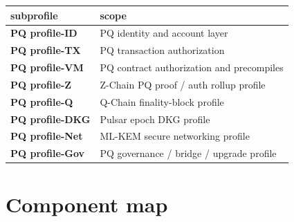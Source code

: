 \documentclass[11pt,a4paper]{article}
\newcommand{\PQ}{\textsf{PQ}}
\begin{document}
\begin{center}\small
\begin{tabular}{l l}
\toprule
subprofile & scope \\
\midrule
\textbf{PQ profile-ID}  & \PQ{} identity and account layer \\
\textbf{PQ profile-TX}  & \PQ{} transaction authorization \\
\textbf{PQ profile-VM}  & \PQ{} contract authorization and precompiles \\
\textbf{PQ profile-Z}   & Z-Chain \PQ{} proof / auth rollup profile \\
\textbf{PQ profile-Q}   & Q-Chain finality-block profile \\
\textbf{PQ profile-DKG} & Pulsar epoch DKG profile \\
\textbf{PQ profile-Net} & ML-KEM secure networking profile \\
\textbf{PQ profile-Gov} & \PQ{} governance / bridge / upgrade profile \\
\bottomrule
\end{tabular}
\end{center}

\section{Component map}
\label{sec:components}
\end{document}

